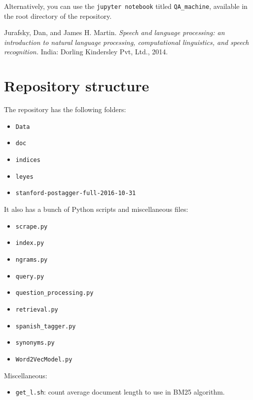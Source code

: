 \documentclass[letterpaper, margin=1in]{article}
\begin{document}
Alternatively, you can use the \texttt{jupyter notebook} titled \texttt{QA{\_}machine}, available in the root directory of the repository.

\begin{thebibliography}{9}
  Jurafsky, Dan, and James H. Martin. 
  \emph{Speech and language processing: an introduction to natural language processing, computational linguistics, and speech recognition.} 
  India: Dorling Kindersley Pvt, Ltd., 2014.

\end{thebibliography}

\newpage
\appendix

\section{Repository structure}
The repository has the following folders:
\begin{itemize}
\item \texttt{Data}
\item \texttt{doc}
\item \texttt{indices}
\item \texttt{leyes}
\item \texttt{stanford-postagger-full-2016-10-31}
\end{itemize}

It also has a bunch of Python scripts and miscellaneous files:

\begin{itemize}
\item \texttt{scrape.py}
\item \texttt{index.py}
\item \texttt{ngrams.py}
\item \texttt{query.py}
\item \texttt{question{\_}processing.py}
\item \texttt{retrieval.py}
\item \texttt{spanish{\_}tagger.py}
\item \texttt{synonyms.py}
\item \texttt{Word2VecModel.py}
\end{itemize}

Miscellaneous:
\begin{itemize}
\item \texttt{get{\_}l.sh}: count average document length to use in BM25 algorithm.
\end{itemize}
\end{document}
